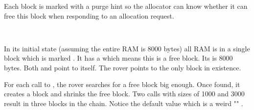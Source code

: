 Each block is marked with a purge hint so the allocator can know whether it can free this block when responding to an allocation request.\\
\par
{}\\
\par
In its initial state (assuming the entire RAM is 8000 bytes) all RAM is in a single block which is marked . It has a   which means this is a free block. Its  is 8000 bytes. Both  and  point to itself. The rover points to the only block in existence.\\
\par
{}
\par
For each call to , the rover searches for a free block big enough. Once found, it creates a block and shrinks the free block. Two calls with sizes of 1000 and 3000 result in three blocks in the chain. Notice the default  value which is a weird "" .\\
\par
{}

